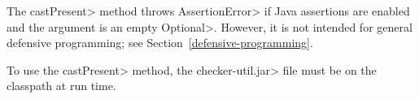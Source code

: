   The \<castPresent> method throws \<AssertionError> if Java assertions are
  enabled and the argument is an empty \<Optional>.
  However, it is not intended for general defensive programming; see
  Section~\ref{defensive-programming}.

  To use the \<castPresent> method, the \<checker-util.jar> file
  must be on the classpath at run time.

